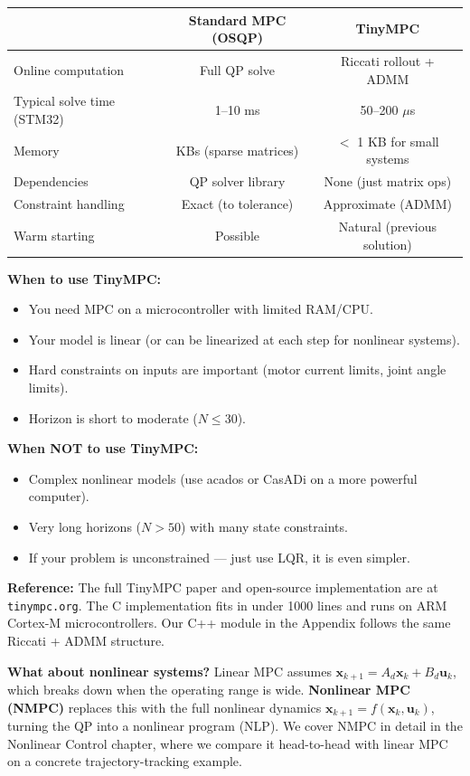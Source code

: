 \begin{center}
\begin{tabular}{lcc}
\toprule
 & \textbf{Standard MPC (OSQP)} & \textbf{TinyMPC} \\
\midrule
Online computation & Full QP solve & Riccati rollout + ADMM \\
Typical solve time (STM32) & 1--10 ms & 50--200 $\mu$s \\
Memory & KBs (sparse matrices) & $<$ 1 KB for small systems \\
Dependencies & QP solver library & None (just matrix ops) \\
Constraint handling & Exact (to tolerance) & Approximate (ADMM) \\
Warm starting & Possible & Natural (previous solution) \\
\bottomrule
\end{tabular}
\end{center}

\textbf{When to use TinyMPC:}
\begin{itemize}
    \item You need MPC on a microcontroller with limited RAM/CPU.
    \item Your model is linear (or can be linearized at each step for nonlinear systems).
    \item Hard constraints on inputs are important (motor current limits, joint angle limits).
    \item Horizon is short to moderate ($N \leq 30$).
\end{itemize}

\textbf{When NOT to use TinyMPC:}
\begin{itemize}
    \item Complex nonlinear models (use acados or CasADi on a more powerful computer).
    \item Very long horizons ($N > 50$) with many state constraints.
    \item If your problem is unconstrained --- just use LQR, it is even simpler.
\end{itemize}

\textbf{Reference:} The full TinyMPC paper and open-source implementation are at \texttt{tinympc.org}. The C implementation fits in under 1000 lines and runs on ARM Cortex-M microcontrollers. Our C++ module in the Appendix follows the same Riccati + ADMM structure.

\textbf{What about nonlinear systems?} Linear MPC assumes $\mathbf{x}_{k+1} = A_d \mathbf{x}_k + B_d \mathbf{u}_k$, which breaks down when the operating range is wide. \textbf{Nonlinear MPC (NMPC)} replaces this with the full nonlinear dynamics $\mathbf{x}_{k+1} = f(\mathbf{x}_k, \mathbf{u}_k)$, turning the QP into a nonlinear program (NLP). We cover NMPC in detail in the Nonlinear Control chapter, where we compare it head-to-head with linear MPC on a concrete trajectory-tracking example.

